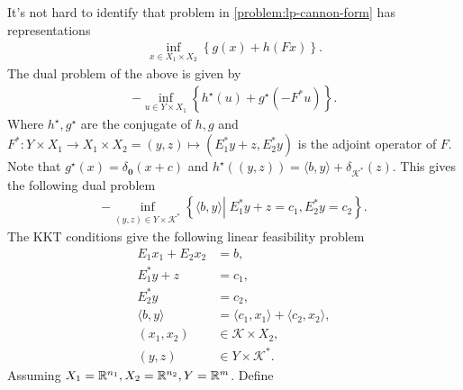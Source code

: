 \documentclass[12pt]{report}
\begin{document}
        It's not hard to identify that problem in \eqref{problem:lp-cannon-form} has representations 
        \begin{align*}
            \inf_{x \in X_1\times X_2}
            \left\lbrace
                g(x) + h(Fx)
            \right\rbrace. 
        \end{align*}
        The dual problem of the above is given by
        \begin{align*}
            -\inf_{u \in Y\times X_1}
            \left\lbrace
                h^\star(u) + g^\star(-F^* u)
            \right\rbrace. 
        \end{align*}
        Where $h^\star, g^\star$ are the conjugate of $h, g$ and $F^*: Y\times X_1 \rightarrow X_1 \times X_2 = (y, z)\mapsto (E_1^*y + z, E_2^*y)$ is the adjoint operator of $F$. 
        Note that $g^\star(x) = \delta_{\mathbf 0}(x + c)$ and $h^\star((y, z)) = \langle b, y\rangle + \delta_{\mathcal K^*}(z)$. 
        This gives the following dual problem 
        \begin{align*}
            - \inf_{(y, z) \in Y \times \mathcal K^*} \left\lbrace
                \langle b, y\rangle 
                \left | \;
                    E_1^*y + z = c_1, 
                    E^*_2y = c_2
                \right.
            \right\rbrace. 
        \end{align*}
        The KKT conditions give the following linear feasibility problem 
        \begin{align*}
            E_1 x_1 + E_2 x_2 &= b, \\
            E_1^* y + z &= c_1, \\
            E_2^* y &= c_2, \\
            \langle b, y\rangle &= \langle c_1, x_1\rangle + \langle c_2, x_2\rangle, \\
            (x_1, x_2) &\in \mathcal K \times X_2, \\
            (y, z) &\in Y \times \mathcal K^*.
        \end{align*}
        Assuming $X_1 = \mathbb R^{n_1}, X_2 = \mathbb R^{n_2}, Y = \mathbb R^m$. 
        Define 
\end{document}
